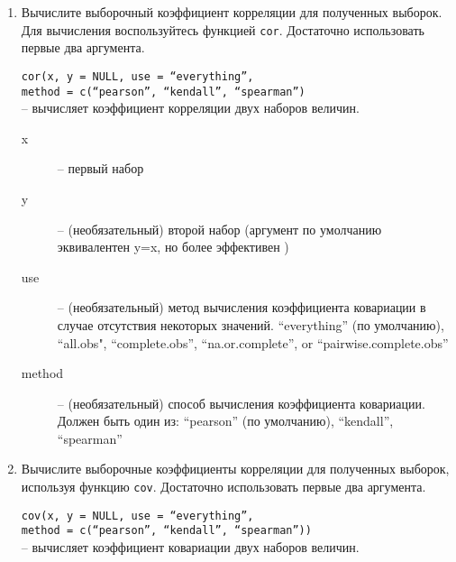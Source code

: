 \begin{enumerate}
    \newpage

    \item Вычислите выборочный коэффициент корреляции для полученных выборок. Для вычисления 
          воспользуйтесь функцией \texttt{cor}. Достаточно использовать первые два аргумента.

          \begin{mdframed}[style=BadassFrame]

              \texttt{cor(x, y = NULL, use = ``everything'', \\ method = c(``pearson'', ``kendall'', ``spearman'')} \\
                -- вычисляет коэффициент корреляции двух наборов величин. 
              \begin{description}

                \item[x] -- первый набор
                \item[y] -- (необязательный) второй набор (аргумент по умолчанию эквивалентен y=x, но более эффективен )
                \item[use] -- (необязательный) метод вычисления коэффициента ковариации в случае отсутствия некоторых значений.
                    ``everything'' (по умолчанию), ``all.obs", ``complete.obs'', ``na.or.complete'', or ``pairwise.complete.obs''
                \item[method] -- (необязательный) способ вычисления коэффициента ковариации. Должен быть один из: 
                    ``pearson'' (по умолчанию), ``kendall'', ``spearman''
              \end{description}
          \end{mdframed}

    \item Вычислите выборочные коэффициенты корреляции для полученных выборок, используя функцию 
          \texttt{cov}. Достаточно использовать первые два аргумента.

          \begin{mdframed}[style=BadassFrame]

              \texttt{cov(x, y = NULL, use = ``everything'', \\ \indent method = c(``pearson'', ``kendall'', ``spearman''))} \\
                    -- вычисляет коэффициент ковариации двух наборов величин. 
              \begin{description}


\end{description}
\end{mdframed}
\end{enumerate}

